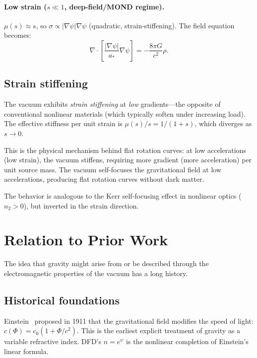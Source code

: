 \documentclass[aps,prd,twocolumn,superscriptaddress,nofootinbib]{revtex4-2}
\begin{document}
\paragraph{Low strain ($s \ll 1$, deep-field/MOND regime).}
$\mu(s) \approx s$, so $\sigma \propto |\nabla\psi|\nabla\psi$
(quadratic, strain-stiffening).  The field equation becomes:
\begin{equation}
\nabla\cdot\left[\frac{|\nabla\psi|}{a_*}\nabla\psi\right]
= -\frac{8\pi G}{c^2}\rho.
\end{equation}

\subsection{Strain stiffening}

The vacuum exhibits \emph{strain stiffening} at \emph{low}
gradients---the opposite of conventional nonlinear materials (which
typically soften under increasing load).  The effective stiffness per
unit strain is $\mu(s)/s = 1/(1+s)$, which diverges as $s \to 0$.

This is the physical mechanism behind flat rotation curves: at low
accelerations (low strain), the vacuum stiffens, requiring more
gradient (more acceleration) per unit source mass.  The vacuum
self-focuses the gravitational field at low accelerations, producing
flat rotation curves without dark matter.

The behavior is analogous to the Kerr self-focusing effect in
nonlinear optics ($n_2 > 0$), but inverted in the strain direction.


\section{Relation to Prior Work}
\label{sec:prior-work}

The idea that gravity might arise from or be described through the
electromagnetic properties of the vacuum has a long history.

\subsection{Historical foundations}

Einstein~\cite{Einstein1911} proposed in 1911 that the gravitational
field modifies the speed of light:
$c(\Phi) = c_0(1 + \Phi/c^2)$.  This is the earliest explicit
treatment of gravity as a variable refractive index.  DFD's
$n = e^\psi$ is the nonlinear completion of Einstein's linear formula.
\end{document}
